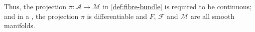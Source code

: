 \begin{marginfigure}
	\caption{
		(a) A field $f : ℳ → F$, where values at any point can be compared.
		(b) A fibre bundle $\fibrebundle F ℱ ℳ$ with a section $f ∈ \secs(ℱ)$ whose individual fibres $F$ are labelled by base point in $ℳ$.
	}
\end{marginfigure}





Thus, the projection $π : 𝒜 → ℳ$ in \cref{def:fibre-bundle} is required to be continuous; and in a , the projection $π$ is differentiable and $F$, $ℱ$ and $ℳ$ are all smooth manifolds.
